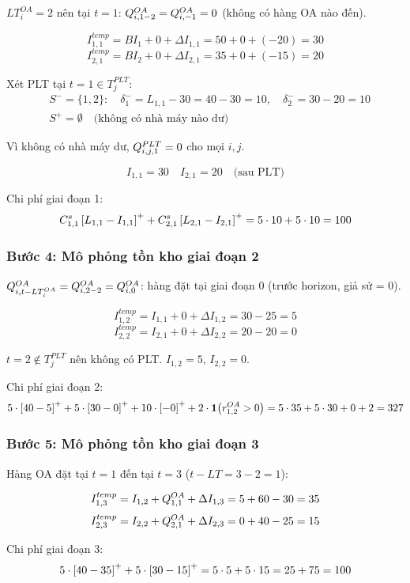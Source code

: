$LT_i^{OA} = 2$ nên tại $t=1$: $Q^{OA}_{i, 1-2} = Q^{OA}_{i,-1} = 0$ (không có hàng OA nào đến).

\[
I^{temp}_{1,1} = BI_1 + 0 + \Delta I_{1,1} = 50 + 0 + (-20) = 30
\]
\[
I^{temp}_{2,1} = BI_2 + 0 + \Delta I_{2,1} = 35 + 0 + (-15) = 20
\]

Xét PLT tại $t=1 \in T_j^{PLT}$:
\begin{align*}
  &S^- = \{1, 2\}: \quad \delta_1^- = L_{1,1} - 30 = 40 - 30 = 10, \quad \delta_2^- = 30 - 20 = 10\\
  &S^+ = \emptyset \quad \text{(không có nhà máy nào dư)}
\end{align*}

Vì không có nhà máy dư, $Q^{PLT}_{i,j,1} = 0$ cho mọi $i,j$.

\[
I_{1,1} = 30 \quad I_{2,1} = 20 \quad \text{(sau PLT)}
\]

Chi phí giai đoạn 1:
\[
C^s_{1,1} \left[L_{1,1} - I_{1,1}\right]^+ + C^s_{2,1} \left[L_{2,1} - I_{2,1}\right]^+ = 5 \cdot 10 + 5 \cdot 10 = 100
\]

\subsubsection*{Bước 4: Mô phỏng tồn kho giai đoạn 2}

$Q^{OA}_{i,t-LT_i^{OA}} = Q^{OA}_{i,2-2} = Q^{OA}_{i,0}$: hàng đặt tại giai đoạn 0 (trước horizon, giả sử = 0).

\[
I^{temp}_{1,2} = I_{1,1} + 0 + \Delta I_{1,2} = 30 - 25 = 5
\]
\[
I^{temp}_{2,2} = I_{2,1} + 0 + \Delta I_{2,2} = 20 - 20 = 0
\]

$t=2 \notin T_j^{PLT}$ nên không có PLT. $I_{1,2} = 5$, $I_{2,2} = 0$.

Chi phí giai đoạn 2:
\[
5\cdot\left[40-5\right]^+ + 5\cdot\left[30-0\right]^+ + 10\cdot\left[-0\right]^+ + 2 \cdot \mathbf{1}\!\left(r^{OA}_{1,2} > 0\right)
= 5\cdot35 + 5\cdot30 + 0 + 2 = 327
\]

\subsubsection*{Bước 5: Mô phỏng tồn kho giai đoạn 3}

Hàng OA đặt tại $t=1$ đến tại $t=3$ ($t-LT = 3-2=1$):

\[
I^{temp}_{1,3} = I_{1,2} + Q^{OA}_{1,1} + \Delta I_{1,3} = 5 + 60 - 30 = 35
\]
\[
I^{temp}_{2,3} = I_{2,2} + Q^{OA}_{2,1} + \Delta I_{2,3} = 0 + 40 - 25 = 15
\]

Chi phí giai đoạn 3:
\[
5\cdot\left[40-35\right]^+ + 5\cdot\left[30-15\right]^+ = 5\cdot5 + 5\cdot15 = 25 + 75 = 100
\]

